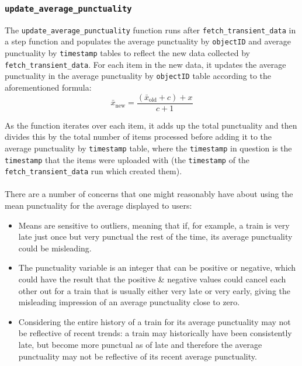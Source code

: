 \documentclass[a4paper,11pt]{report}
\begin{document}
\subsubsection{\texttt{update_average_punctuality}}\label{sec:update_average_punctuality}
The \verb|update_average_punctuality| function runs after \verb|fetch_transient_data| in a step function and populates the average punctuality by \verb|objectID| and average punctuality by \verb|timestamp| tables to reflect the new data collected by \verb|fetch_transient_data|.
For each item in the new data, it updates the average punctuality in the average punctuality by \verb|objectID| table according to the aforementioned formula:
\[
  \bar{x}_{\text{new}} = \frac{\left( \bar{x}_\text{old} + c \right) + x}{c + 1}
\]

As the function iterates over each item, it adds up the total punctuality and then divides this by the total number of items processed before adding it to the average punctuality by \verb|timestamp| table, where the \verb|timestamp| in question is the \verb|timestamp| that the items were uploaded with (the \verb|timestamp| of the \verb|fetch_transient_data| run which created them).
\\\\
There are a number of concerns that one might reasonably have about using the mean punctuality for the average displayed to users:
\begin{itemize}
  \item   Means are sensitive to outliers, meaning that if, for example, a train is very late just once but very punctual the rest of the time, its average punctuality could be misleading.
  \item   The punctuality variable is an integer that can be positive or negative, which could have the result that the positive \& negative values could cancel each other out for a train that is usually either very late or very early, giving the misleading impression of an average punctuality close to zero.
  \item   Considering the entire history of a train for its average punctuality may not be reflective of recent trends:
          a train may historically have been consistently late, but become more punctual as of late and therefore the average punctuality may not be reflective of its recent average punctuality. 
\end{itemize}
\end{document}
